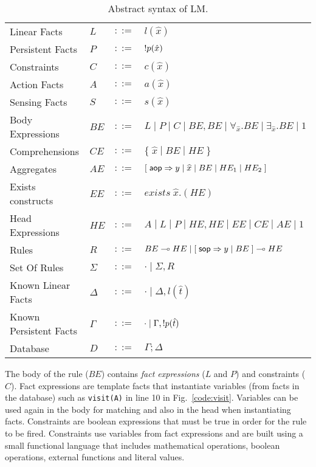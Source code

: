 \begin{table}[h]
   \centering
\begin{tabular}{ l l c l }
  Linear Facts & $L$ & $::=$ & $l(\hat{x})$\\
  Persistent Facts & $P$ & $::=$ & ${!} p(\hat{x})$\\
  Constraints & $C$ & $::=$ & $c(\hat{x})$ \\
  Action Facts & $A$ & $::=$ & $a(\hat{x})$\\
  Sensing Facts & $S$ & $::=$ & $s(\hat{x})$\\
  Body Expressions & $BE$ & $::=$ & $L \; | \; P \; | \; C \; | \; BE, BE \; | \; \forall_{\widehat{x}}. BE \; | \; \exists_{\widehat{x}}. BE \; | \; 1$\\
  Comprehensions & $CE$ & $::=$ & $\{ \; \widehat{x} \; | \; BE \; | \; HE \; \}$ \\
  Aggregates & $AE$ & $::=$ & $[\;\mathsf{aop} \Rightarrow y \; | \; \widehat{x} \; | \; BE \; | \; HE_1 \; | \; HE_2 \;]$ \\
  Exists constructs & $EE$ & $::=$ & $exists \; \widehat{x}. (HE)$ \\
  Head Expressions & $HE$ & $::=$ & $A \; | \; L \; | \; P \; | \; HE, HE \; | \; EE \; | \; CE \; | \; AE \; | \; 1$\\
  Rules & $R$ & $::=$ & $BE \multimap HE \; | \; [\; \mathsf{sop} \Rightarrow y \; | \; BE \;] \multimap HE$ \\
  Set Of Rules & $\Sigma$ & $::=$ & $\cdot \; | \; \Sigma, R$\\
  Known Linear Facts & $\Delta$ & $::=$ & $\cdot \; | \; \Delta, l(\hat{t})$ \\
  Known Persistent Facts & $\Gamma$ & $::=$ & $\cdot \; | \; \Gamma, {!} p(\hat{t})$ \\
  Database & $D$ & $::=$ & $\Gamma; \Delta$ \\
\end{tabular}
\caption{Abstract syntax of LM.}\label{tbl:ast}
\end{table}

The body of the rule ($BE$) contains \emph{fact expressions} ($L$ and $P$) and
constraints ($C$). Fact expressions are template facts that instantiate variables
(from facts in the database)
such as \texttt{visit(A)} in line 10 in Fig.~\ref{code:visit}. Variables can be used again in the body for matching and
also in the head when instantiating facts. Constraints are boolean expressions that must
be true in order for the rule to be fired. Constraints use variables from fact expressions and are built using a small functional language that includes mathematical operations, boolean operations, external functions and literal values.

